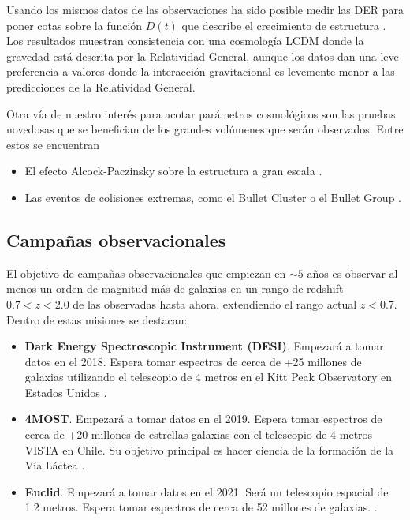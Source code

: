 Usando los mismos datos de las observaciones ha sido posible
medir las DER para poner cotas sobre la funci\'on $D(t)$ que describe
el crecimiento de estructura \cite{2014MNRAS.439.3504S}. 
Los resultados muestran consistencia con una cosmolog\'ia LCDM donde la
gravedad est\'a descrita por la Relatividad General, aunque los datos
dan una leve preferencia a valores donde la interacci\'on
gravitacional es levemente menor a las predicciones de la Relatividad
General. 

Otra v\'ia de nuestro inter\'es para acotar par\'ametros
cosmol\'ogicos son las pruebas novedosas que se benefician de los
grandes vol\'umenes que ser\'an observados.
Entre estos se encuentran 

\begin{itemize}
\item El efecto Alcock-Paczinsky sobre la estructura a gran escala \cite{2013arXiv1309.1162S}.
\item Las eventos de colisiones extremas, como el Bullet Cluster o el
  Bullet Group \cite{Bullets2010, Bullets2014}. 
\end{itemize}


\subsection{Campa\~nas observacionales}

El objetivo de campa\~nas observacionales que empiezan en $\sim 5$
a\~nos es observar al menos un orden de magnitud m\'as de galaxias en
un rango de redshift $0.7<z<2.0$ de las observadas hasta ahora,
extendiendo el rango actual $z<0.7$. 
Dentro de estas misiones se destacan:

\begin{itemize}
\item {\bf Dark Energy Spectroscopic Instrument (DESI)}. Empezar\'a a
  tomar datos en el 2018. Espera tomar espectros de cerca de +25 millones de
  galaxias utilizando el telescopio de 4 metros en el Kitt Peak
  Observatory en Estados Unidos \cite{DESI}.
\item {\bf 4MOST}. Empezar\'a a tomar datos en el 2019. Espera
  tomar espectros de cerca de +20 millones de estrellas galaxias con el
  telescopio de 4 metros VISTA en Chile. Su objetivo principal es
  hacer ciencia de la formaci\'on de la V\'ia L\'actea \cite{4MOST}.
\item {\bf Euclid}. Empezar\'a a tomar datos en el 2021. Ser\'a un
  telescopio espacial de 1.2 metros. Espera tomar espectros de cerca
  de 52 millones de galaxias. \cite{EUCLID}.
\end{itemize}

